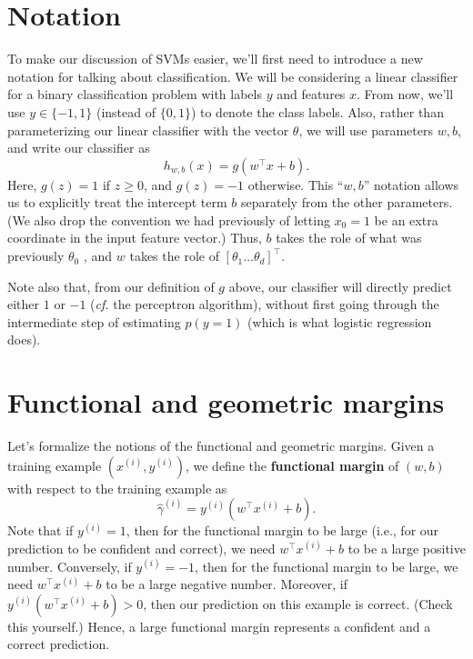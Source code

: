 \section{Notation}
To make our discussion of SVMs easier, we'll first need to introduce a new
notation for talking about classification. We will be considering a linear
classifier for a binary classification problem with labels $y$ and features $x$.
From now, we'll use $y \in \{-1,1\}$ (instead of $\{0,1\}$) to denote the class labels.
Also, rather than parameterizing our linear classifier with the vector $\theta$, we
will use parameters $w,b$, and write our classifier as
\begin{equation*}
    h_{w,b} (x) = g(w^\top x + b).    
\end{equation*}
Here, $g(z) = 1$ if $z \ge 0$, and $g(z) = -1$ otherwise. This ``$w,b$'' notation
allows us to explicitly treat the intercept term $b$ separately from the other
parameters. (We also drop the convention we had previously of letting $x_0 = 1$
be an extra coordinate in the input feature vector.) Thus, $b$ takes the role of
what was previously $\theta_0$ , and $w$ takes the role of $[\theta_1 \ldots \theta_d]^\top$.

Note also that, from our definition of $g$ above, our classifier will directly
predict either $1$ or $-1$ (\textit{cf.} the perceptron algorithm), without first going %
through the intermediate step of estimating $p(y = 1)$ (which is what logistic
regression does).

\section{Functional and geometric margins}\label{sec:margins}
Let's formalize the notions of the functional and geometric margins. Given a
training example $(x^{(i)} ,y^{(i)} )$, we define the \textbf{functional margin} of $(w,b)$ with
respect to the training example as
\begin{equation*}
    \hat{\gamma}^{(i)} = y^{(i)} (w^\top x^{(i)} + b).
\end{equation*}
Note that if $y^{(i)} = 1$, then for the functional margin to be large (i.e., for
our prediction to be confident and correct), we need $w^\top x^{(i)} + b$ to be a large
positive number. Conversely, if $y^{(i)} = -1$, then for the functional margin
to be large, we need $w^\top x^{(i)} + b$ to be a large negative number. Moreover, if
$y^{(i)} (w^\top x^{(i)} + b) > 0$, then our prediction on this example is correct. (Check
this yourself.) Hence, a large functional margin represents a confident and a
correct prediction.

